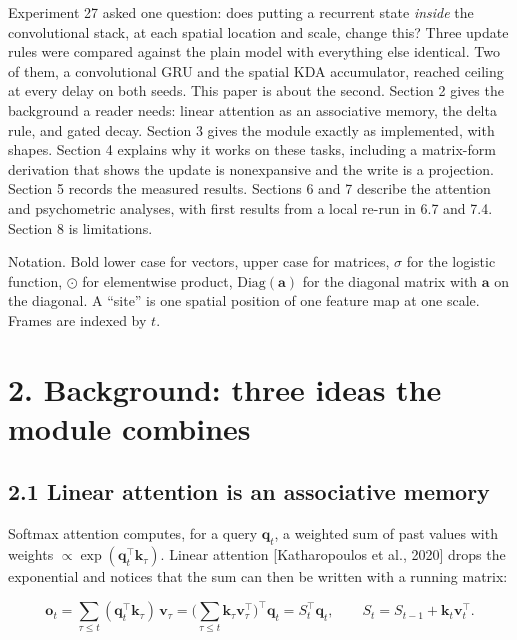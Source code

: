\documentclass[

]{article}
\newcounter{none} %
\begin{document}
Experiment 27 asked one question: does putting a recurrent state \emph{inside} the convolutional stack, at each spatial location and scale, change this? Three update rules were compared against the plain model with everything else identical. Two of them, a convolutional GRU and the spatial KDA accumulator, reached ceiling at every delay on both seeds. This paper is about the second. Section 2 gives the background a reader needs: linear attention as an associative memory, the delta rule, and gated decay. Section 3 gives the module exactly as implemented, with shapes. Section 4 explains why it works on these tasks, including a matrix-form derivation that shows the update is nonexpansive and the write is a projection. Section 5 records the measured results. Sections 6 and 7 describe the attention and psychometric analyses, with first results from a local re-run in 6.7 and 7.4. Section 8 is limitations.



Notation. Bold lower case for vectors, upper case for matrices, \(\sigma\) for the logistic function, \(\odot\) for elementwise product, \(\mathrm{Diag}(\mathbf{a})\) for the diagonal matrix with \(\mathbf{a}\) on the diagonal. A ``site'' is one spatial position of one feature map at one scale. Frames are indexed by \(t\).



\section{2. Background: three ideas the module combines}\label{background-three-ideas-the-module-combines}



\subsection{2.1 Linear attention is an associative memory}\label{linear-attention-is-an-associative-memory}



Softmax attention computes, for a query \(\mathbf{q}_t\), a weighted sum of past values with weights \(\propto \exp(\mathbf{q}_t^\top \mathbf{k}_\tau)\). Linear attention {[}Katharopoulos et al., 2020{]} drops the exponential and notices that the sum can then be written with a running matrix:



\[

\mathbf{o}_t=\sum_{\tau\le t}(\mathbf{q}_t^\top\mathbf{k}_\tau)\,\mathbf{v}_\tau

=\Big(\sum_{\tau\le t}\mathbf{k}_\tau\mathbf{v}_\tau^\top\Big)^{\!\top}\mathbf{q}_t

= S_t^\top\mathbf{q}_t,\qquad S_t=S_{t-1}+\mathbf{k}_t\mathbf{v}_t^\top .

\]
\end{document}
